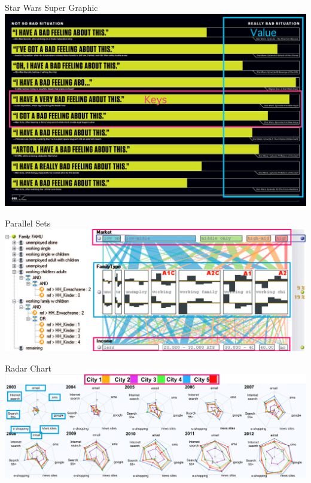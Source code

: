 \documentclass[xcolor={dvipsnames}]{beamer}
\begin{document}
\begin{frame}{Star Wars Super Graphic\cite{leong_star_2017}}
\includegraphics[width=\textwidth]{figs/starwards.jpeg}
\end{frame}

\begin{frame}{Parallel Sets\cite{kosara_parallel_2006}}
\includegraphics[width=\textwidth]{figs/parallelsets.png}
\end{frame}


\begin{frame}{Radar Chart \cite{albo_off_2016}}
\includegraphics[width=\textwidth]{figs/cities_anotated.png}
\end{frame}
\end{document}

